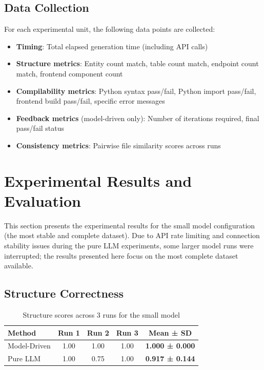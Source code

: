 \documentclass[11pt,a4paper]{article}
\begin{document}
\subsection{Data Collection}

For each experimental unit, the following data points are collected:

\begin{itemize}
    \item \textbf{Timing}: Total elapsed generation time (including API calls)
    \item \textbf{Structure metrics}: Entity count match, table count match, endpoint count match, frontend component count
    \item \textbf{Compilability metrics}: Python syntax pass/fail, Python import pass/fail, frontend build pass/fail, specific error messages
    \item \textbf{Feedback metrics} (model-driven only): Number of iterations required, final pass/fail status
    \item \textbf{Consistency metrics}: Pairwise file similarity scores across runs
\end{itemize}

\newpage
\section{Experimental Results and Evaluation}
\label{sec:results}

This section presents the experimental results for the small model configuration (the most stable and complete dataset). Due to API rate limiting and connection stability issues during the pure LLM experiments, some larger model runs were interrupted; the results presented here focus on the most complete dataset available.

\subsection{Structure Correctness}

\begin{table}[H]
\centering
\caption{Structure scores across 3 runs for the small model}
\label{tab:structure}
\begin{tabular}{lccc|c}
\toprule
\textbf{Method} & \textbf{Run 1} & \textbf{Run 2} & \textbf{Run 3} & \textbf{Mean ± SD} \\
\midrule
Model-Driven & 1.00 & 1.00 & 1.00 & \textbf{1.000 ± 0.000} \\
Pure LLM     & 1.00 & 0.75 & 1.00 & \textbf{0.917 ± 0.144} \\
\bottomrule
\end{tabular}
\end{table}
\end{document}
